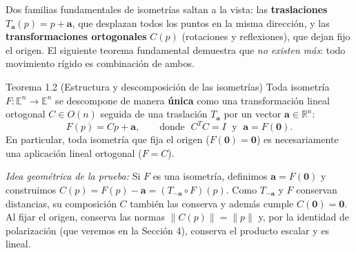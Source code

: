 \documentclass[11pt,letterpaper]{article}
\newcommand{\term}[1]{\textbf{\color{orangeacc}#1}}
\begin{document}
Dos familias fundamentales de isometrías saltan a la vista: las \term{traslaciones} $T_{\mathbf{a}}(p)=p+\mathbf{a}$, que desplazan todos los puntos en la misma dirección, y las \term{transformaciones ortogonales} $C(p)$ (rotaciones y reflexiones), que dejan fijo el origen. El siguiente teorema fundamental demuestra que \emph{no existen más}: todo movimiento rígido es combinación de ambos.

\begin{theorembox}{Teorema 1.2 (Estructura y descomposición de las isometrías)}
Toda isometría $F:\mathbb{E}^n\to\mathbb{E}^n$ se descompone de manera \textbf{única} como una transformación lineal ortogonal $C\in O(n)$ seguida de una traslación $T_{\mathbf{a}}$ por un vector $\mathbf{a}\in\mathbb{R}^n$:
\begin{equation}
  F(p) = C p + \mathbf{a}, \qquad\text{donde }\; C^T C = I \;\text{ y }\; \mathbf{a} = F(\mathbf{0}).
\end{equation}
En particular, toda isometría que fija el origen ($F(\mathbf{0})=\mathbf{0}$) es necesariamente una aplicación lineal ortogonal ($F=C$).
\end{theorembox}

\emph{Idea geométrica de la prueba:} Si $F$ es una isometría, definimos $\mathbf{a}=F(\mathbf{0})$ y construimos $C(p) = F(p) - \mathbf{a} = (T_{-\mathbf{a}}\circ F)(p)$. Como $T_{-\mathbf{a}}$ y $F$ conservan distancias, su composición $C$ también las conserva y además cumple $C(\mathbf{0})=\mathbf{0}$. Al fijar el origen, conserva las normas $\|C(p)\| = \|p\|$ y, por la identidad de polarización (que veremos en la Sección 4), conserva el producto escalar y es lineal.
\end{document}
